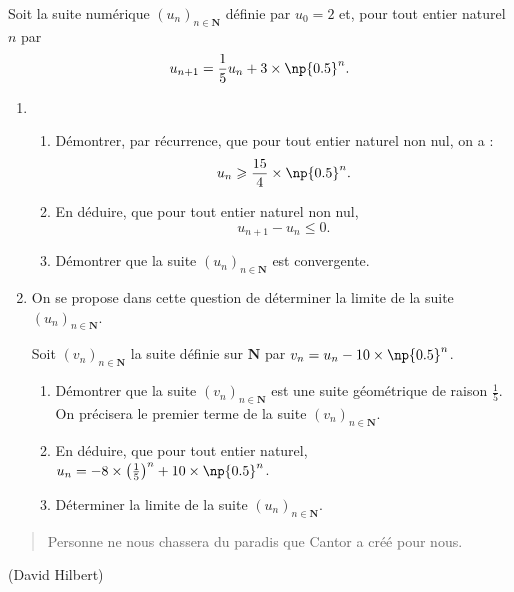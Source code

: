 \documentclass[a4paper,12pt,french]{article}
\newcommand{\N}{\mathbf{N}}
\begin{document}
\begin{Exercise}[number=3,title={7 points}]
  Soit la suite numérique $(u_n)_{n\in\N}$ définie par $u_0 = 2$ et,
  pour tout entier naturel $n$ par \[ u_{n+1} = \frac15u_n + 3 \times
  \np{0.5}^n. \]
  \begin{enumerate}
    \item \begin{enumerate}
        \item Démontrer, par récurrence, que pour tout entier naturel
          non nul, on a : \[ u_n \geqslant \frac{15}4 \times
          \np{0.5}^n.\]
        \item En déduire, que pour tout entier naturel non nul, \[
          u_{n+1} - u_n \leqslant 0.\]
        \item Démontrer que la suite $(u_n)_{n\in\N}$ est convergente.
      \end{enumerate}
    \item On se propose dans cette question de déterminer la limite de
      la suite $(u_n)_{n\in\N}$.

      Soit $(v_n)_{n\in\N}$ la suite définie sur $\N$ par $v_n = u_n -
      10\times \np{0.5}^n$.
      \begin{enumerate}
        \item Démontrer que la suite $(v_n)_{n\in\N}$ est une suite
          géométrique de raison $\frac15$. On précisera le premier terme
          de la suite $(v_n)_{n\in\N}$.
        \item En déduire, que pour tout entier naturel, $u_n = -8 \times
          \left(\frac15\right)^n + 10\times \np{0.5}^n$.
        \item Déterminer la limite de la suite $(u_n)_{n\in\N}$.
      \end{enumerate}
  \end{enumerate}
\end{Exercise}
\vfill
\hfill \begin{quote}Personne ne nous chassera du paradis que Cantor a
créé pour nous.\end{quote}\hfill(David Hilbert)\vspace{2cm}
\pagebreak
\end{document}
